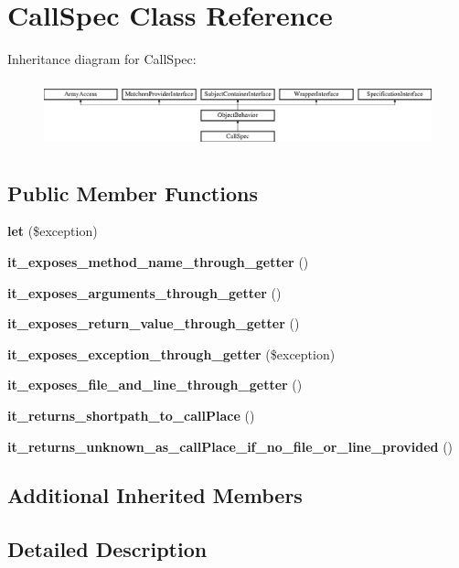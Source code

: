 \section{Call\+Spec Class Reference}
\label{classspec_1_1_prophecy_1_1_call_1_1_call_spec}
Inheritance diagram for Call\+Spec\+:\begin{figure}[H]
\begin{center}
\leavevmode
\includegraphics[height=1.953488cm]{classspec_1_1_prophecy_1_1_call_1_1_call_spec}
\end{center}
\end{figure}
\subsection*{Public Member Functions}
\begin{DoxyCompactItemize}
\item 
{\bf let} (\$exception)
\item 
{\bf it\+\_\+exposes\+\_\+method\+\_\+name\+\_\+through\+\_\+getter} ()
\item 
{\bf it\+\_\+exposes\+\_\+arguments\+\_\+through\+\_\+getter} ()
\item 
{\bf it\+\_\+exposes\+\_\+return\+\_\+value\+\_\+through\+\_\+getter} ()
\item 
{\bf it\+\_\+exposes\+\_\+exception\+\_\+through\+\_\+getter} (\$exception)
\item 
{\bf it\+\_\+exposes\+\_\+file\+\_\+and\+\_\+line\+\_\+through\+\_\+getter} ()
\item 
{\bf it\+\_\+returns\+\_\+shortpath\+\_\+to\+\_\+call\+Place} ()
\item 
{\bf it\+\_\+returns\+\_\+unknown\+\_\+as\+\_\+call\+Place\+\_\+if\+\_\+no\+\_\+file\+\_\+or\+\_\+line\+\_\+provided} ()
\end{DoxyCompactItemize}
\subsection*{Additional Inherited Members}


\subsection{Detailed Description}


